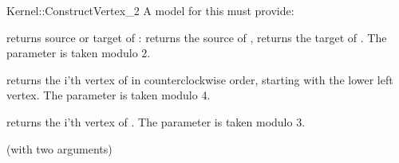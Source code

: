 \begin{ccRefFunctionObjectConcept}{Kernel::ConstructVertex_2}
A model for this must provide:



 {returns source or target of : \ccVar{}
  returns the source of , \ccVar{} returns the target
  of . The parameter  is taken modulo 2. }

 {returns the i'th vertex of
   in counterclockwise order, starting with the lower left
  vertex. The parameter  is taken modulo 4.}

 {returns the i'th vertex of . The parameter
   is taken modulo 3.}


\ccRefines
{} (with two arguments)

\ccSeeAlso
{} \\
 \\
 \\

\end{ccRefFunctionObjectConcept}
